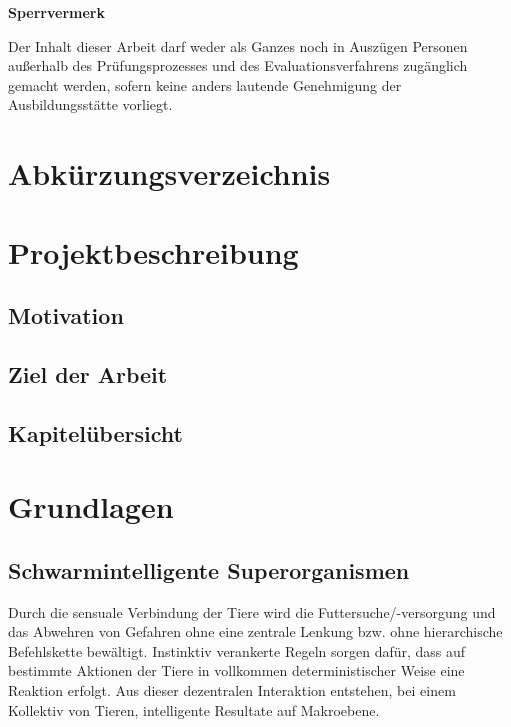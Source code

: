\documentclass[a4paper, 11pt]{article}
\makeatletter
\newcommand*{\maintoc}{%
	\begingroup
	\@fileswfalse%
	\renewcommand*{\appendixattoc}{%
		\value{tocdepth}=-10000 %
	}%
	\tableofcontents%
	\endgroup
}
\newcommand*{\appendixattoc}{%
}
\makeatother
\begin{document}
\newpage
\begin{framed}
	\begin{center}
		\Large\bfseries Sperrvermerk
	\end{center}
	\medskip
	\noindent
	Der Inhalt dieser Arbeit darf weder als Ganzes noch in Auszügen Personen
	außerhalb des Prüfungsprozesses und des Evaluationsverfahrens zugänglich gemacht
	werden, sofern keine anders lautende Genehmigung der Ausbildungsstätte vorliegt.
\end{framed}
\newpage
{}
\renewcommand{\abstractname}{Zusammenfassung}
\begin{abstract}
\end{abstract}
\newpage
\maintoc           %
\newpage
\listoffigures             %
\newpage
\listoftables              %
\newpage
\section*{\Large \textbf Abkürzungsverzeichnis}  
\begin{acronym}[Bash]
\end{acronym}
\newpage
{} 
\section{Projektbeschreibung}
\subsection{Motivation}

\subsection{Ziel der Arbeit}
\subsection{Kapitelübersicht}
\newpage
\section{Grundlagen}
\subsection{Schwarmintelligente Superorganismen}
Durch die sensuale Verbindung der Tiere wird die Futtersuche/-versorgung und das Abwehren von Gefahren ohne eine zentrale Lenkung bzw. ohne hierarchische Befehlskette bewältigt. Instinktiv verankerte Regeln sorgen dafür, dass auf bestimmte Aktionen der Tiere in vollkommen deterministischer Weise eine Reaktion erfolgt. Aus dieser dezentralen Interaktion entstehen, bei einem Kollektiv von Tieren, intelligente Resultate auf Makroebene.
\end{document}
